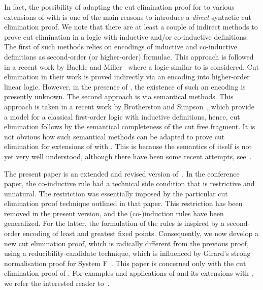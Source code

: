 \documentclass[preprint]{elsarticle}
\begin{document}
In fact, the possibility of adapting the cut elimination proof for
 to various extensions of  with  is one of the
main reasons to introduce a \emph{direct} syntactic cut elimination
proof.  We note that there are at least a couple of indirect methods
to prove cut elimination in a logic with inductive and/or co-inductive
definitions.  The first of such methods relies on encodings of
inductive and co-inductive definitions as second-order (or
higher-order) formulae. This approach is followed in a recent work by
Baelde and Miller~\cite{baelde07lpar} where a  logic similar to 
is considered. Cut elimination in their work is proved indirectly via
an encoding into higher-order linear logic. However, in the presence
of , the existence of such an encoding is presently unknown.
The second approach is via semantical methods. This approach is taken
in a recent work by Brotherston and Simpson~\cite{BrotherstonS07},
which provide a model for
a classical first-order logic with inductive definitions, hence, cut
elimination follows  by the semantical completeness of the cut
free fragment.  It is not obvious how such semantical methods can be
adapted to prove cut elimination for extensions of  with
.  This is 
because the semantics of  itself is not yet
very well understood, although there have been some recent attempts,
see~\cite{Miculan05FOSSACS,Schoepp07LFMTP,GabbayFL}.


The present paper is an extended and revised version
of~\cite{Momigliano03TYPES}.  In the conference paper, the co-inductive
rule had a technical side condition that is restrictive and
unnatural. The restriction was essentially imposed by the particular
cut elimination proof technique outlined in that paper.  This
restriction has been removed in the present version, and the
(co-)induction rules have been generalized. For the latter, the
formulation of the rules is inspired by a second-order encoding of
least and greatest fixed points.  Consequently, we now develop a new
cut elimination proof, which is radically different from the previous
proof, using a reducibility-candidate technique, which is influenced
by Girard's strong normalisation proof for System
F~\cite{girard89book}.  This paper is concerned only with the cut
elimination proof of .  For examples and applications of
 and its extensions with , we refer the interested reader
to~\cite{tiu04phd,Bedwyr,gacek08lics,Abella,AbellaSOS,TiuMillerpi}.
\end{document}
